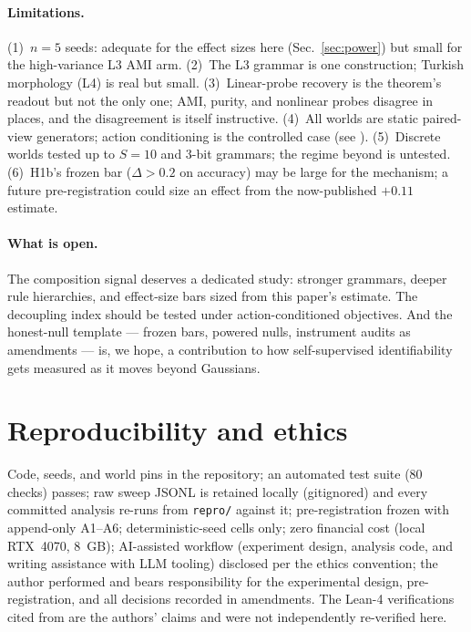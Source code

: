 \documentclass[11pt]{article}
\begin{document}
\paragraph{Limitations.}
(1)~$n{=}5$ seeds: adequate for the effect sizes here (Sec.~\ref{sec:power})
but small for the high-variance L3 AMI arm. (2)~The L3 grammar is one
construction; Turkish morphology (L4) is real but small. (3)~Linear-probe
recovery is the theorem's readout but not the only one; AMI, purity, and
nonlinear probes disagree in places, and the disagreement is itself
instructive. (4)~All worlds are static paired-view generators; action
conditioning is the controlled case (see \citet{controlledWM2026}).
(5)~Discrete worlds tested up to $S{=}10$ and 3-bit grammars; the regime
beyond is untested. (6)~H1b's frozen bar ($\Delta{>}0.2$ on accuracy) may be
large for the mechanism; a future pre-registration could size an effect from
the now-published $+0.11$ estimate.

\paragraph{What is open.}
The composition signal deserves a dedicated study: stronger grammars, deeper
rule hierarchies, and effect-size bars sized from this paper's estimate.
The decoupling index should be tested under action-conditioned objectives.
And the honest-null template --- frozen bars, powered nulls, instrument
audits as amendments --- is, we hope, a contribution to how self-supervised
identifiability gets measured as it moves beyond Gaussians.

\section*{Reproducibility and ethics}
Code, seeds, and world pins in the repository; an automated test suite
(80 checks) passes;
raw sweep JSONL is retained locally (gitignored) and every committed analysis
re-runs from \texttt{repro/} against it; pre-registration frozen with
append-only A1--A6;
deterministic-seed cells only; zero financial cost (local RTX~4070, 8~GB);
AI-assisted workflow (experiment design, analysis code, and writing assistance
with LLM tooling) disclosed per the ethics convention; the author performed
and bears responsibility for the experimental design, pre-registration, and
all decisions recorded in amendments. The Lean-4 verifications cited from \citet{klindt2026lejepa} are the
authors' claims and were not independently re-verified here.

\setlength{\bibsep}{6pt}


\end{document}
